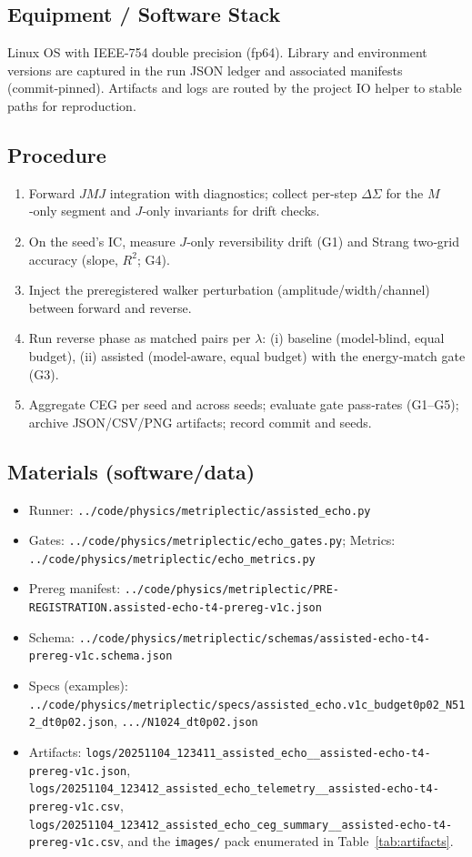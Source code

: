 \documentclass{article}
\begin{document}
\subsection*{Equipment / Software Stack}
Linux OS with IEEE‑754 double precision (fp64). Library and environment versions are captured in the run JSON ledger and associated manifests (commit‑pinned). Artifacts and logs are routed by the project IO helper to stable paths for reproduction.

\subsection*{Procedure}
\begin{enumerate}[leftmargin=*]
  \item Forward $J\!M\!J$ integration with diagnostics; collect per‑step $\Delta \Sigma$ for the $M$‑only segment and $J$‑only invariants for drift checks.
  \item On the seed’s IC, measure $J$‑only reversibility drift (G1) and Strang two‑grid accuracy (slope, $R^2$; G4).
  \item Inject the preregistered walker perturbation (amplitude/width/channel) between forward and reverse.
  \item Run reverse phase as matched pairs per $\lambda$: (i) baseline (model‑blind, equal budget), (ii) assisted (model‑aware, equal budget) with the energy‑match gate (G3).
  \item Aggregate CEG per seed and across seeds; evaluate gate pass‑rates (G1–G5); archive JSON/CSV/PNG artifacts; record commit and seeds.
\end{enumerate}

\subsection*{Materials (software/data)}
\begin{itemize}[leftmargin=*]
  \item Runner: \texttt{../code/physics/metriplectic/assisted\_echo.py}
  \item Gates: \texttt{../code/physics/metriplectic/echo\_gates.py}; Metrics: \texttt{../code/physics/metriplectic/echo\_metrics.py}
  \item Prereg manifest: \texttt{../code/physics/metriplectic/PRE-REGISTRATION.assisted-echo-t4-prereg-v1c.json}
  \item Schema: \texttt{../code/physics/metriplectic/schemas/assisted-echo-t4-prereg-v1c.schema.json}
  \item Specs (examples): \texttt{../code/physics/metriplectic/specs/assisted\_echo.v1c\_budget0p02\_N512\_dt0p02.json}, \texttt{.../N1024\_dt0p02.json}
  \item Artifacts: \texttt{logs/20251104\_123411\_assisted\_echo\_\_assisted-echo-t4-prereg-v1c.json}, \texttt{logs/20251104\_123412\_assisted\_echo\_telemetry\_\_assisted-echo-t4-prereg-v1c.csv}, \texttt{logs/20251104\_123412\_assisted\_echo\_ceg\_summary\_\_assisted-echo-t4-prereg-v1c.csv}, and the \texttt{images/} pack enumerated in Table~\ref{tab:artifacts}.
\end{itemize}
\end{document}
